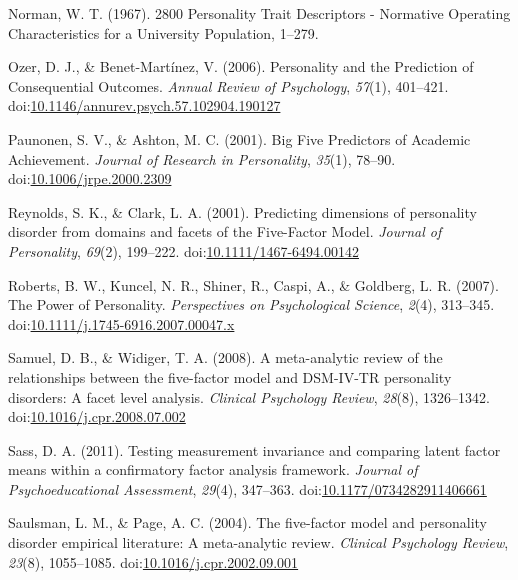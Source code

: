 \documentclass[man]{apa6}
\theoremstyle{definition}
\theoremstyle{definition}
\theoremstyle{definition}
\theoremstyle{remark}
\begin{document}
\leavevmode\hypertarget{ref-Norman1967}{}%
Norman, W. T. (1967). 2800 Personality Trait Descriptors - Normative
Operating Characteristics for a University Population, 1--279.

\leavevmode\hypertarget{ref-OzerBenet2006}{}%
Ozer, D. J., \& Benet-Martínez, V. (2006). Personality and the
Prediction of Consequential Outcomes. \emph{Annual Review of
Psychology}, \emph{57}(1), 401--421.
doi:\href{https://doi.org/10.1146/annurev.psych.57.102904.190127}{10.1146/annurev.psych.57.102904.190127}

\leavevmode\hypertarget{ref-Paunonen2001}{}%
Paunonen, S. V., \& Ashton, M. C. (2001). Big Five Predictors of
Academic Achievement. \emph{Journal of Research in Personality},
\emph{35}(1), 78--90.
doi:\href{https://doi.org/10.1006/jrpe.2000.2309}{10.1006/jrpe.2000.2309}

\leavevmode\hypertarget{ref-ClarkReynolds2001}{}%
Reynolds, S. K., \& Clark, L. A. (2001). Predicting dimensions of
personality disorder from domains and facets of the Five-Factor Model.
\emph{Journal of Personality}, \emph{69}(2), 199--222.
doi:\href{https://doi.org/10.1111/1467-6494.00142}{10.1111/1467-6494.00142}

\leavevmode\hypertarget{ref-Roberts2007a}{}%
Roberts, B. W., Kuncel, N. R., Shiner, R., Caspi, A., \& Goldberg, L. R.
(2007). The Power of Personality. \emph{Perspectives on Psychological
Science}, \emph{2}(4), 313--345.
doi:\href{https://doi.org/10.1111/j.1745-6916.2007.00047.x}{10.1111/j.1745-6916.2007.00047.x}

\leavevmode\hypertarget{ref-SamuelWidiger2008}{}%
Samuel, D. B., \& Widiger, T. A. (2008). A meta-analytic review of the
relationships between the five-factor model and DSM-IV-TR personality
disorders: A facet level analysis. \emph{Clinical Psychology Review},
\emph{28}(8), 1326--1342.
doi:\href{https://doi.org/10.1016/j.cpr.2008.07.002}{10.1016/j.cpr.2008.07.002}

\leavevmode\hypertarget{ref-Sass2011}{}%
Sass, D. A. (2011). Testing measurement invariance and comparing latent
factor means within a confirmatory factor analysis framework.
\emph{Journal of Psychoeducational Assessment}, \emph{29}(4), 347--363.
doi:\href{https://doi.org/10.1177/0734282911406661}{10.1177/0734282911406661}

\leavevmode\hypertarget{ref-SaulsmanPage2004}{}%
Saulsman, L. M., \& Page, A. C. (2004). The five-factor model and
personality disorder empirical literature: A meta-analytic review.
\emph{Clinical Psychology Review}, \emph{23}(8), 1055--1085.
doi:\href{https://doi.org/10.1016/j.cpr.2002.09.001}{10.1016/j.cpr.2002.09.001}
\end{document}
